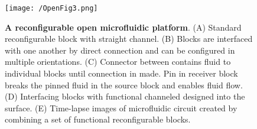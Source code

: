\begin{figure}[h!] %
\centering
\texttt{[image: /OpenFig3.png]}
\caption[\textbf{A reconfigurable open microfluidic platform}]{\textbf{A reconfigurable open microfluidic platform}. (A) Standard reconfigurable block with straight channel. (B) Blocks are interfaced with one another by direct connection and can be configured in multiple orientations. (C) Connector between contains fluid to individual blocks until connection in made. Pin in receiver block breaks the pinned fluid in the source block and enables fluid flow. (D) Interfacing blocks with functional channeled designed into the surface. (E) Time-lapse images of microfluidic circuit created by combining a set of functional reconfigurable blocks.}
\label{figure:Fig3}
\end{figure}


